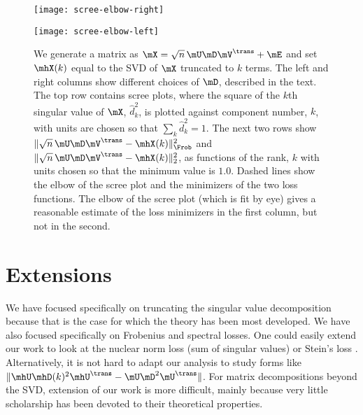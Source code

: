\begin{figure}[ht]
    \begin{center}
        \begin{minipage}{0.49\textwidth}
            \begin{center}
                \texttt{[image: scree-elbow-right]}
            \end{center}
        \end{minipage}
        \begin{minipage}{0.49\textwidth}
            \begin{center}
                \texttt{[image: scree-elbow-left]}
            \end{center}
        \end{minipage}
        \caption{
            We generate a matrix as 
            $\mX = \sqrt{n} \, \mU \mD \mV^\trans + \mE$ 
            and set $\mhX(k)$ equal to the SVD of $\mX$ truncated to $k$ 
            terms.  The left and right columns show different choices of
            $\mD$, described in the text.  The top row contains scree plots, 
            where the square of the $k$th singular value of $\mX$,
            $\hat d_k^2$, is plotted against 
            component number, $k$, with units are chosen so that 
            $\sum_{k} \hat d_k^2 = 1$.  The next two rows show
            $\| \sqrt{n} \, \mU \mD \mV^\trans - \mhX(k) \|_\Frob^2$ and
            $\| \sqrt{n} \, \mU \mD \mV^\trans - \mhX(k) \|_2^2$, as functions
            of the rank, $k$ with units chosen so that the minimum value is
            $1.0$.  Dashed lines show the elbow of the scree plot and the
            minimizers of the two loss functions.  
            The elbow of the scree plot (which is fit by eye)
            gives a reasonable estimate of the loss minimizers in the first 
            column, but not in the second.
        }\label{F:scree-elbow}
    \end{center}
\end{figure}

\clearpage

\section{Extensions}\label{S:intrinsic-rank-extensions}

We have focused specifically on truncating the singular value decomposition
because that is the case for which the theory has been most developed. We have
also focused specifically on Frobenius and spectral losses. One could easily
extend our work to look at the nuclear norm loss (sum of singular values)
\cite{fazel2002mrm} or Stein's loss \cite{james1961ewq}. Alternatively, it is
not hard to adapt our analysis to study forms like $\| \mhU \mhD(k)^2
\mhU^\trans - \mU \mD^2 \mU^\trans \|$. For matrix decompositions beyond the
SVD, extension of our work is more difficult, mainly because very little
scholarship has been devoted to their theoretical properties.

